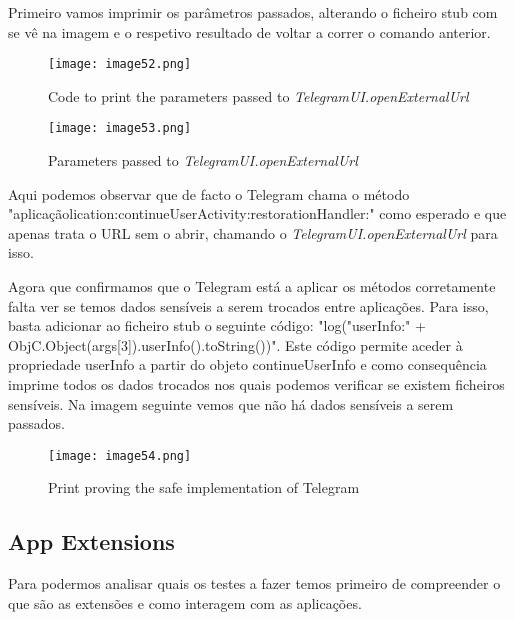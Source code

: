 \begin{enumerate}
	Primeiro vamos imprimir os parâmetros passados, alterando o ficheiro stub com se vê na imagem e o respetivo resultado de voltar a correr o comando anterior.

\begin{figure}[H]
\centering
\texttt{[image: image52.png]}
\caption {Code to print the parameters passed to \textit{TelegramUI.openExternalUrl}}
\label {fig02}
\end{figure}

\begin{figure}[H]
\centering
\texttt{[image: image53.png]}
\caption {Parameters passed to \textit{TelegramUI.openExternalUrl}}
\label {fig02}
\end{figure}

		Aqui podemos observar que de facto o Telegram chama o método "aplicaçãolication:continueUserActivity:restorationHandler:" como esperado e que apenas trata o URL sem o abrir, chamando o \textit{TelegramUI.openExternalUrl} para isso.\par
\hfill\par

	Agora que confirmamos que o Telegram está a aplicar os métodos corretamente falta ver se temos dados sensíveis a serem trocados entre aplicações. Para isso, basta adicionar ao ficheiro stub o seguinte código: "log("userInfo:" + ObjC.Object(args[3]).userInfo().toString())". Este código  permite aceder à propriedade userInfo a partir do objeto continueUserInfo e como consequência imprime todos os dados trocados nos quais podemos verificar se existem ficheiros sensíveis.
	Na imagem seguinte vemos que não há dados sensíveis a serem passados.
	
\begin{figure}[H]
\centering
\texttt{[image: image54.png]}
\caption {Print proving the safe implementation of Telegram}
\label {fig02}
\end{figure}
\end{enumerate}




\subsection{App Extensions}
\hfill\par
Para podermos analisar quais os testes a fazer temos primeiro de compreender o que são as extensões e como interagem com as aplicações.

